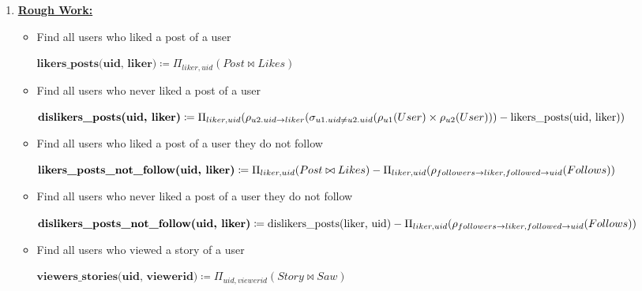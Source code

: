 \documentclass[12pt]{article}
\begin{document}
\begin{enumerate}[1.]
    \item

    \bigskip

    \underline{\textbf{Rough Work:}}

    \bigskip

    \begin{itemize}
        \item Find all users who liked a post of a user

        \begin{mdframed}
        $\textbf{likers\_posts(uid, liker)} \coloneqq \Pi_{liker, uid}(Post \bowtie Likes)$
        \end{mdframed}

        \item Find all users who never liked a post of a user

        \begin{mdframed}
        $\textbf{dislikers\_posts(uid, liker)} \coloneqq \Pi_{liker, uid}(\rho_{u2.uid \to liker}(\sigma_{u1.uid \neq u2.uid}(\\\rho_{u1}(User) \times \rho_{u2}(User))) - \text{likers\_posts(uid, liker)})$
        \end{mdframed}

        \item Find all users who liked a post of a user they do not follow

        \begin{mdframed}
        $\textbf{likers\_posts\_not\_follow(uid, liker)} \coloneqq \Pi_{liker, uid}(Post \bowtie Likes) -\\ \Pi_{liker, uid}(\rho_{followers \to liker, followed \to uid}(Follows))$
        \end{mdframed}

        \item Find all users who never liked a post of a user they do not follow

        \begin{mdframed}
        $\textbf{dislikers\_posts\_not\_follow(uid, liker)} \coloneqq \text{dislikers\_posts(liker, uid)} -\\ \Pi_{liker, uid}(\rho_{followers \to liker, followed \to uid}(Follows))$
        \end{mdframed}

        \item Find all users who viewed a story of a user

        \begin{mdframed}
        $\textbf{viewers\_stories(uid, viewerid)} \coloneqq \Pi_{uid, viewerid}(Story \bowtie Saw)$
        \end{mdframed}


\end{itemize}
\end{enumerate}
\end{document}
